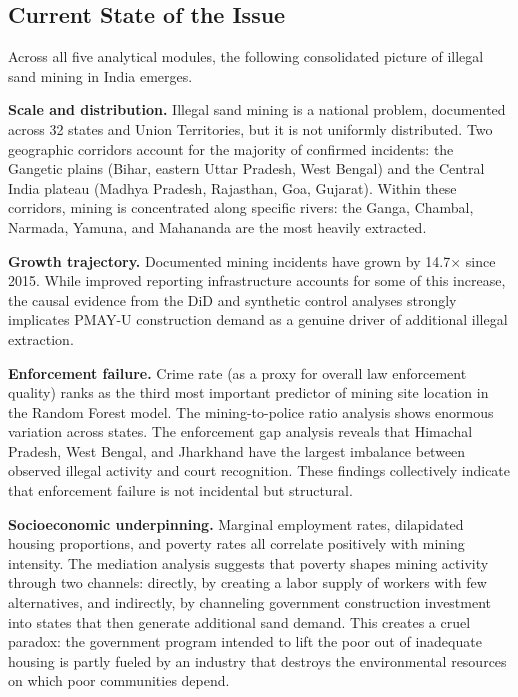 \documentclass[12pt]{article}
\begin{document}
\subsection{Current State of the Issue}

Across all five analytical modules, the following consolidated picture of illegal sand mining in India emerges.

\textbf{Scale and distribution.} Illegal sand mining is a national problem, documented across 32 states and Union Territories, but it is not uniformly distributed. Two geographic corridors account for the majority of confirmed incidents: the Gangetic plains (Bihar, eastern Uttar Pradesh, West Bengal) and the Central India plateau (Madhya Pradesh, Rajasthan, Goa, Gujarat). Within these corridors, mining is concentrated along specific rivers: the Ganga, Chambal, Narmada, Yamuna, and Mahananda are the most heavily extracted.

\textbf{Growth trajectory.} Documented mining incidents have grown by 14.7$\times$ since 2015. While improved reporting infrastructure accounts for some of this increase, the causal evidence from the DiD and synthetic control analyses strongly implicates PMAY-U construction demand as a genuine driver of additional illegal extraction.

\textbf{Enforcement failure.} Crime rate (as a proxy for overall law enforcement quality) ranks as the third most important predictor of mining site location in the Random Forest model. The mining-to-police ratio analysis shows enormous variation across states. The enforcement gap analysis reveals that Himachal Pradesh, West Bengal, and Jharkhand have the largest imbalance between observed illegal activity and court recognition. These findings collectively indicate that enforcement failure is not incidental but structural.

\textbf{Socioeconomic underpinning.} Marginal employment rates, dilapidated housing proportions, and poverty rates all correlate positively with mining intensity. The mediation analysis suggests that poverty shapes mining activity through two channels: directly, by creating a labor supply of workers with few alternatives, and indirectly, by channeling government construction investment into states that then generate additional sand demand. This creates a cruel paradox: the government program intended to lift the poor out of inadequate housing is partly fueled by an industry that destroys the environmental resources on which poor communities depend.
\end{document}
